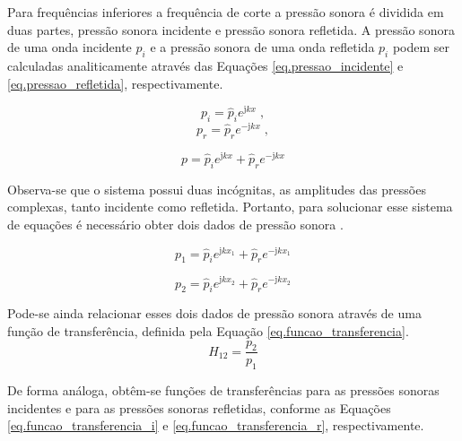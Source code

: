 Para frequências inferiores a frequência de corte a pressão sonora é dividida em duas partes, pressão sonora incidente e pressão sonora refletida. A pressão sonora de uma onda incidente $p_{i}$ e a pressão sonora de uma onda refletida $p_{i}$ podem ser calculadas analiticamente através das Equações \ref{eq.pressao_incidente} e \ref{eq.pressao_refletida}, respectivamente.

\begin{equation}
p_{i}=\widehat{p}_{i}e^{\text{j}kx}\;,
\label{eq.pressao_incidente}
\end{equation}
\begin{equation}
p_{r}=\widehat{p}_{r}e^{-\text{j}kx}\;,
\label{eq.pressao_refletida}
\end{equation}

\begin{equation}
p= \widehat{p}_{i}e^{\text{j}kx} + \widehat{p}_{r}e^{-\text{j}kx}
\end{equation}

Observa-se que o sistema possui duas incógnitas, as amplitudes das pressões complexas, tanto incidente como refletida. Portanto, para solucionar esse sistema de equações é necessário obter dois dados de pressão sonora .

\begin{equation}
p_{1}= \widehat{p}_{i}e^{\text{j}kx_{1}} + \widehat{p}_{r}e^{-\text{j}kx_{1}}
\end{equation}

\begin{equation}
p_{2}= \widehat{p}_{i}e^{\text{j}kx_{2}} + \widehat{p}_{r}e^{-\text{j}kx_{2}}
\end{equation}

Pode-se ainda relacionar esses dois dados de pressão sonora através de uma função de transferência, definida pela Equação \ref{eq.funcao_transferencia}.
\begin{equation}
H_{12}=\frac{p_{2}}{p_{1}}
\label{eq.funcao_transferencia}
\end{equation}

De forma análoga, obtêm-se funções de transferências para as pressões sonoras incidentes e para as pressões sonoras refletidas, conforme as Equações \ref{eq.funcao_transferencia_i} e \ref{eq.funcao_transferencia_r}, respectivamente.

